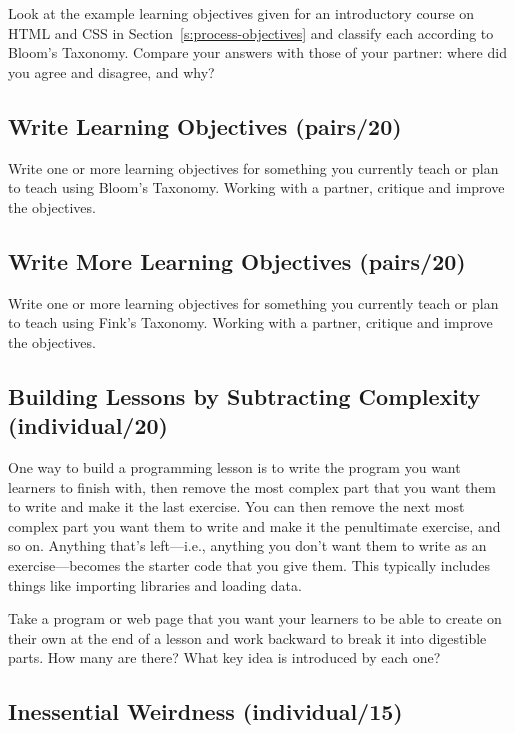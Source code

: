 Look at the example learning objectives given for an introductory course
on HTML and CSS in Section~\ref{s:process-objectives} and classify each
according to Bloom's Taxonomy. Compare your answers with those of your
partner: where did you agree and disagree, and why?

\subsection*{Write Learning Objectives (pairs/20)}

Write one or more learning objectives for something you currently teach
or plan to teach using Bloom's Taxonomy. Working with a partner,
critique and improve the objectives.

\subsection*{Write More Learning Objectives (pairs/20)}

Write one or more learning objectives for something you currently teach
or plan to teach using Fink's Taxonomy. Working with a partner, critique
and improve the objectives.

\subsection*{Building Lessons by Subtracting Complexity (individual/20)}

One way to build a programming lesson is to write the program you want
learners to finish with, then remove the most complex part that you want
them to write and make it the last exercise. You can then remove the
next most complex part you want them to write and make it the
penultimate exercise, and so on. Anything that's left---i.e., anything you
don't want them to write as an exercise---becomes the starter code that
you give them. This typically includes things like importing libraries
and loading data.

Take a program or web page that you want your learners to be able to
create on their own at the end of a lesson and work backward to break it
into digestible parts. How many are there? What key idea is introduced
by each one?

\subsection*{Inessential Weirdness (individual/15)}

